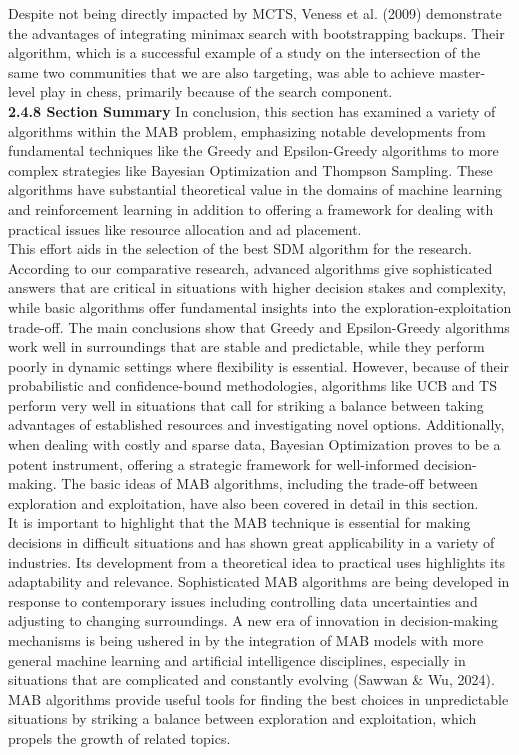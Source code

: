 \documentclass[a4paper,11pt,onecolumn]{article}
\begin{document}
Despite not being directly impacted by MCTS, Veness et al. (2009) demonstrate the advantages of integrating minimax search with bootstrapping backups. Their algorithm, which is a successful example of a study on the intersection of the same two communities that we are also targeting, was able to achieve master-level play in chess, primarily because of the search component.\newline \\
\textbf{2.4.8 Section Summary}
In conclusion, this section has examined a variety of algorithms within the MAB problem, emphasizing notable developments from fundamental techniques like the Greedy and Epsilon-Greedy algorithms to more complex strategies like Bayesian Optimization and Thompson Sampling. These algorithms have substantial theoretical value in the domains of machine learning and reinforcement learning in addition to offering a framework for dealing with practical issues like resource allocation and ad placement. \\
This effort aids in the selection of the best SDM algorithm for the research. According to our comparative research, advanced algorithms give sophisticated answers that are critical in situations with higher decision stakes and complexity, while basic algorithms offer fundamental insights into the exploration-exploitation trade-off. The main conclusions show that Greedy and Epsilon-Greedy algorithms work well in surroundings that are stable and predictable, while they perform poorly in dynamic settings where flexibility is essential. However, because of their probabilistic and confidence-bound methodologies, algorithms like UCB and TS perform very well in situations that call for striking a balance between taking advantages of established resources and investigating novel options. Additionally, when dealing with costly and sparse data, Bayesian Optimization proves to be a potent instrument, offering a strategic framework for well-informed decision-making. The basic ideas of MAB algorithms, including the trade-off between exploration and exploitation, have also been covered in detail in this section.\\
It is important to highlight that the MAB technique is essential for making decisions in difficult situations and has shown great applicability in a variety of industries. Its development from a theoretical idea to practical uses highlights its adaptability and relevance. Sophisticated MAB algorithms are being developed in response to contemporary issues including controlling data uncertainties and adjusting to changing surroundings. A new era of innovation in decision-making mechanisms is being ushered in by the integration of MAB models with more general machine learning and artificial intelligence disciplines, especially in situations that are complicated and constantly evolving (Sawwan & Wu, 2024). MAB algorithms provide useful tools for finding the best choices in unpredictable situations by striking a balance between exploration and exploitation, which propels the growth of related topics.\newline \\
\end{document}
